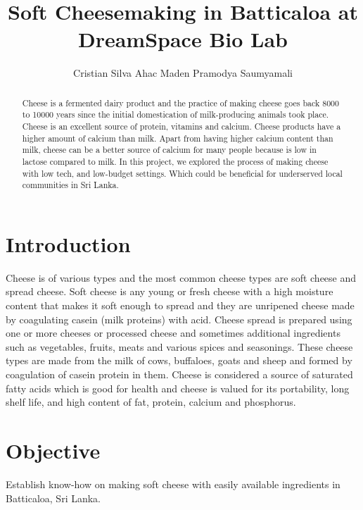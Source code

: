 \documentclass[12pt]{article}
\title{Soft Cheesemaking in Batticaloa at DreamSpace Bio Lab}
\author{Cristian Silva\inst{1} Ahac Maden\inst{1} Pramodya Saumyamali \inst{2}}
\begin{document}
 
	
	\maketitle
	
	\begin{abstract}
	     Cheese is a fermented dairy product and the practice of making cheese goes back 8000 to 10000 years since the initial domestication of milk-producing animals took place. Cheese is an excellent source of protein, vitamins and calcium. Cheese products have a higher amount of calcium than milk. Apart from having higher calcium content than milk, cheese can be a better source of calcium for many people because is low in lactose compared to  milk. In this project, we explored the process of making cheese with low tech, and low-budget settings. Which could be beneficial for underserved local communities in Sri Lanka.
	\end{abstract}
	    
		
	
	
	\section{Introduction}
	\label{sec:introduction}
	Cheese is of various types and the most common cheese types are soft cheese and spread cheese. Soft cheese is any young or fresh cheese with a high moisture content that makes it soft enough to spread and they are unripened cheese made by coagulating casein (milk proteins) with acid. Cheese spread is prepared using one or more cheeses or processed cheese and sometimes additional ingredients such as vegetables, fruits, meats and various spices and seasonings. These cheese types are made from the milk of cows, buffaloes, goats and sheep and formed by coagulation of casein protein in them. Cheese is considered a source of saturated fatty acids which is good for health and cheese is valued for its portability, long shelf life, and high content of fat, protein, calcium and phosphorus.

	\section{Objective}
	\label{sec:objective}
	
Establish know-how on making soft cheese with easily available ingredients in Batticaloa, Sri Lanka.



	
	
\end{document}
